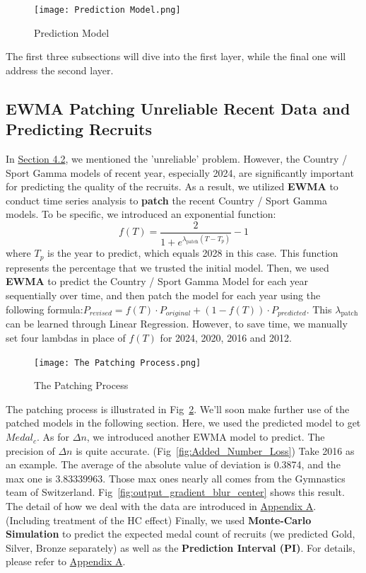 \documentclass{mcmthesis}
\begin{document}
\begin{figure}
    \centering
    \texttt{[image: Prediction Model.png]}
    \caption{Prediction Model}
    \label{fig:Prediction Model}
\end{figure}

The first three subsections will dive into the first layer, while the final one will address the second layer.

\subsection{EWMA Patching Unreliable Recent Data and Predicting Recruits}
\label{sec:5.1}

In \hyperref[sec:4.2]{Section 4.2}, we mentioned the 'unreliable' problem. However, the Country / Sport Gamma models of recent year, especially 2024, are significantly important for predicting the quality of the recruits. As a result, we utilized \textbf{EWMA} to conduct time series analysis to \textbf{patch} the recent Country / Sport Gamma models. To be specific, we introduced an exponential function:
\[
f(T) = \frac{2}{1 + e^{\lambda_{\text{patch}}(T - T_{p})}} - 1
\]
where $T_{p}$ is the year to predict, which equals 2028 in this case. This function represents the percentage that we trusted the initial model. Then, we used \textbf{EWMA} to predict the Country / Sport Gamma Model for each year sequentially over time, and then patch the model for each year using the following formula:$P_{revised} = f(T) \cdot P_{original} + (1 - f(T)) \cdot P_{predicted}$. This $\lambda_{\text{patch}}$ can be learned through Linear Regression. However, to save time, we manually set four lambdas in place of $f(T)$ for 2024, 2020, 2016 and 2012.

\begin{figure}
    \centering
    \texttt{[image: The Patching Process.png]}
    \caption{The Patching Process}
    \label{fig:The Patching Process}
\end{figure}

The patching process is illustrated in Fig~\ref{fig:The Patching Process}. We'll soon make further use of the patched models in the following section.
Here, we used the predicted model to get $Medal_c$. As for $\Delta n$, we introduced another EWMA model to predict. The precision of $\Delta n$ is quite accurate. (Fig~\ref{fig:Added_Number_Loss}) Take 2016 as an example. The average of the absolute value of deviation is 0.3874, and the max one is 3.83339963. Those max ones nearly all comes from the Gymnastics team of Switzerland. Fig~\ref{fig:output_gradient_blur_center} shows this result. The detail of how we deal with the data are introduced in \hyperref[appA]{Appendix A}. (Including treatment of the HC effect)
Finally, we used \textbf{Monte-Carlo Simulation} to predict the expected medal count of recruits (we predicted Gold, Silver, Bronze separately) as well as the \textbf{Prediction Interval (PI)}. For details, please refer to \hyperref[appA]{Appendix A}.
\end{document}
